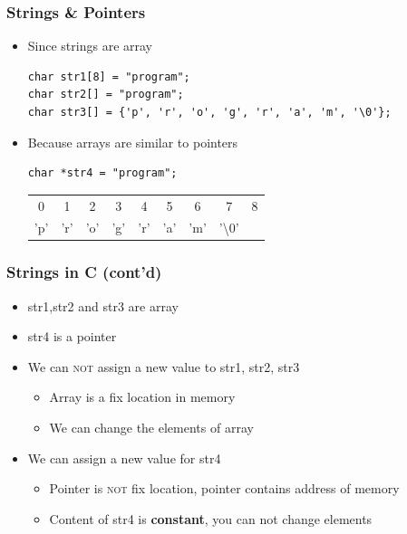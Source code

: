 \documentclass{../c-lecture}
\begin{document}
\begin{frame}[fragile]
  \frametitle{Strings \& Pointers}
  \begin{itemize}
    \item Since strings are array
    \begin{verbatim}
char str1[8] = "program";
char str2[] = "program";
char str3[] = {'p', 'r', 'o', 'g', 'r', 'a', 'm', '\0'};
    \end{verbatim}
    \item Because arrays are similar to pointers
    \begin{verbatim}
char *str4 = "program";
    \end{verbatim}
    \begin{tabular}{*9{c}}
      0 & 1 & 2 & 3 & 4 & 5 & 6 & 7 & 8 \\
      'p' &
      'r' &
      'o' &
      'g' &
      'r' &
      'a' &
      'm' &
      '\textbackslash 0' \\
    \end{tabular}
  \end{itemize}
\end{frame}

\begin{frame}
  \frametitle{Strings in C (cont’d)}
  \begin{itemize}
    \item str1,str2 and str3 are array
    \item str4 is a pointer
    \item
      We can \textsc{\color{RubineRed} not} assign a new value to str1,
      str2, str3
    \begin{itemize}
      \item Array is a fix location in memory
      \item We can change the elements of array
    \end{itemize}
    \item We can assign a new value for str4
    \begin{itemize}
      \item
        Pointer is \textsc{\color{RubineRed} not} fix location, pointer
        contains address of memory
      \item
        Content of str4 is \textbf{\color{LimeGreen} constant}, you can not
        change elements
    \end{itemize}
  \end{itemize}
\end{frame}
\end{document}
